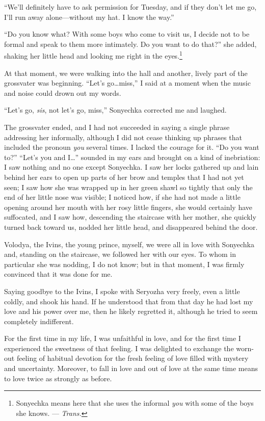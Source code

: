 ``We'll definitely have to ask permission for Tuesday, and if they don't let me go, I'll run away alone---without my hat. I know the way.'' %

``Do you know what? With some boys who come to visit us, I decide not to be formal and speak to them more intimately. Do you want to do that?'' she added, shaking her little head and looking me right in the eyes.\footnote{Sonyechka means here that she uses the informal \textit{you} with some of the boys she knows. --- \textit{Trans.}} %

At that moment, we were walking into the hall and another, lively part of the grossvater was beginning. ``Let's go\ldots{}miss,'' I said at a moment when the music and noise could drown out my words.

``Let's go, \emph{sis}, not let's go, miss,'' Sonyechka corrected me and laughed. %

The grossvater ended, and I had not succeeded in saying a single phrase addressing her informally, although I did not cease thinking up phrases that included the pronoun \textit{you} several times. I lacked the courage for it. ``Do you want to?'' ``Let's you and I\ldots{}'' sounded in my ears and brought on a kind of inebriation: I saw nothing and no one except Sonyechka. I saw her locks gathered up and lain behind her ears to open up parts of her brow and temples that I had not yet seen; I saw how she was wrapped up in her green shawl so tightly that only the end of her little nose was visible; I noticed how, if she had not made a little opening around her mouth with her rosy little fingers, she would certainly have suffocated, and I saw how, descending the staircase with her mother, she quickly turned back toward us, nodded her little head, and disappeared behind the door.

Volodya, the Ivins, the young prince, myself, we were all in love with Sonyechka and, standing on the staircase, we followed her with our eyes. To whom in particular she was nodding, I do not know; but in that moment, I was firmly convinced that it was done for me.

Saying goodbye to the Ivins, I spoke with Seryozha very freely, even a little coldly, and shook his hand. If he understood that from that day he had lost my love and his power over me, then he likely regretted it, although he tried to seem completely indifferent.

For the first time in my life, I was unfaithful in love, and for the first time I experienced the sweetness of that feeling. I was delighted to exchange the worn-out feeling of habitual devotion for the fresh feeling of love filled with mystery and uncertainty. Moreover, to fall in love and out of love at the same time means to love twice as strongly as before.

